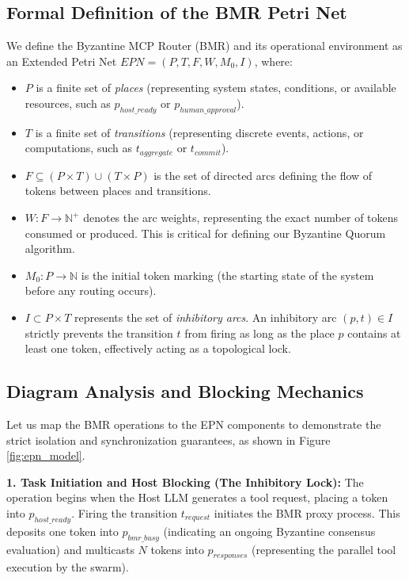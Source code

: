 \documentclass[a4paper,11pt,twocolumn]{article}
\theoremstyle{definition}
\theoremstyle{plain}
\begin{document}

\subsection{Formal Definition of the BMR Petri Net}
We define the Byzantine MCP Router (BMR) and its operational environment as an Extended Petri Net $EPN = (P, T, F, W, M_0, I)$, where:
\begin{itemize}
    \item $P$ is a finite set of \textit{places} (representing system states, conditions, or available resources, such as $p_{host\_ready}$ or $p_{human\_approval}$).
    \item $T$ is a finite set of \textit{transitions} (representing discrete events, actions, or computations, such as $t_{aggregate}$ or $t_{commit}$).
    \item $F \subseteq (P \times T) \cup (T \times P)$ is the set of directed arcs defining the flow of tokens between places and transitions.
    \item $W: F \to \mathbb{N}^+$ denotes the arc weights, representing the exact number of tokens consumed or produced. This is critical for defining our Byzantine Quorum algorithm.
    \item $M_0: P \to \mathbb{N}$ is the initial token marking (the starting state of the system before any routing occurs).
    \item $I \subset P \times T$ represents the set of \textit{inhibitory arcs}. An inhibitory arc $(p, t) \in I$ strictly prevents the transition $t$ from firing as long as the place $p$ contains at least one token, effectively acting as a topological lock.
\end{itemize}

\subsection{Diagram Analysis and Blocking Mechanics}
Let us map the BMR operations to the EPN components to demonstrate the strict isolation and synchronization guarantees, as shown in Figure \ref{fig:epn_model}.

\textbf{1. Task Initiation and Host Blocking (The Inhibitory Lock):}
The operation begins when the Host LLM generates a tool request, placing a token into $p_{host\_ready}$. Firing the transition $t_{request}$ initiates the BMR proxy process. This deposits one token into $p_{bmr\_busy}$ (indicating an ongoing Byzantine consensus evaluation) and multicasts $N$ tokens into $p_{responses}$ (representing the parallel tool execution by the swarm). 
\end{document}
